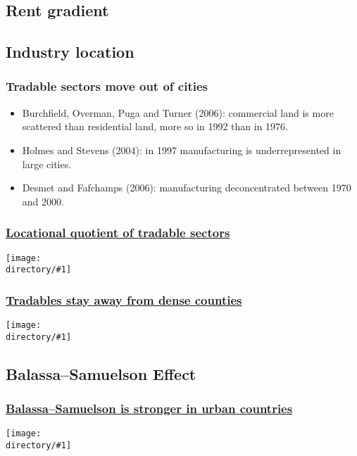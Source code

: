 \documentclass[handout,compress,mathserif]{beamer}
\newcommand{\directory}{figures}
\newcommand{\widefigure}[2]{\begin{frame}\frametitle{\hyperlink{#1back}{#2}}\hypertarget{#1}{{\begin{center}\texttt{[image: \\directory/\#1]}\end{center}}}\end{frame}}
\begin{document}
\subsection{Rent gradient}

\subsection{Industry location}
\begin{frame}\frametitle{Tradable sectors move out of cities}
\begin{itemize}
    \item Burchfield, Overman, Puga and Turner (2006): commercial land is more scattered than residential land, more so in 1992 than in 1976.
    \item Holmes and Stevens (2004): in 1997 manufacturing is underrepresented in large cities.
    \item Desmet and Fafchamps (2006): manufacturing deconcentrated between 1970 and 2000.
\end{itemize}
\end{frame}

\widefigure{LQ_map}{Locational quotient of tradable sectors}
\widefigure{LQ_scatter}{Tradables stay away from dense counties}

\subsection{Balassa--Samuelson Effect}
\widefigure{sc_penn}{Balassa--Samuelson is stronger in urban countries}
\end{document}
